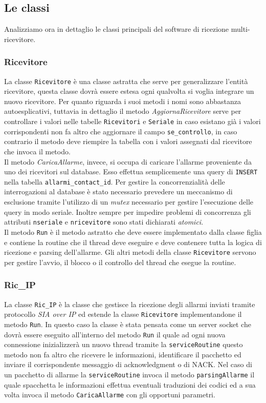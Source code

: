 \subsection{Le classi}
Analizziamo ora in dettaglio le classi principali del software di ricezione multi-ricevitore.
\subsubsection{Ricevitore}
La classe \texttt{Ricevitore} è una classe astratta che serve per generalizzare l'entità ricevitore, questa classe dovrà essere estesa ogni qualvolta si voglia integrare un nuovo ricevitore. Per quanto riguarda i suoi metodi i nomi sono abbastanza autoesplicativi, tuttavia in dettaglio il metodo \emph{AggiornaRicevitore} serve per controllare i valori nelle tabelle \texttt{Ricevitori} e \texttt{Seriale} in caso esistano già i valori corrispondenti non fa altro che aggiornare il campo \texttt{se\_controllo}, in caso contrario il metodo deve riempire la tabella con i valori assegnati dal ricevitore che invoca il metodo.\\
Il metodo \emph{CaricaAllarme}, invece, si occupa di caricare l'allarme proveniente da uno dei ricevitori sul database. Esso effettua semplicemente una query di \texttt{INSERT} nella tabella \texttt{allarmi\_contact\_id}. Per gestire la concorrenzialità delle interrogazioni al database è stato necessario prevedere un meccanismo di esclusione tramite l'utilizzo di un \emph{mutex} necessario per gestire l'esecuzione delle query in modo seriale. Inoltre sempre per impedire problemi di concorrenza gli attributi \texttt{nseriale} e \texttt{nricevitore} sono stati dichiarati \emph{atomici}.\\
Il metodo \texttt{Run} è il metodo astratto che deve essere implementato dalla classe figlia e contiene la routine che il thread deve eseguire e deve contenere tutta la logica di ricezione e parsing dell'allarme. Gli altri metodi della classe \texttt{Ricevitore} servono per gestire l'avvio, il blocco o il controllo del thread che esegue la routine.\\
\subsubsection{Ric\_IP}
La classe \texttt{Ric\_IP} è la classe che gestisce la ricezione degli allarmi inviati tramite protocollo \emph{SIA over IP} ed estende la classe \texttt{Ricevitore} implementandone il metodo \texttt{Run}. In questo caso la classe è stata pensata come un server socket che dovrà essere eseguito all'interno del metodo \texttt{Run} il quale ad ogni nuova connessione inizializzerà un nuovo  thread tramite la \texttt{serviceRoutine} questo metodo non fa altro che ricevere le informazioni, identificare il pacchetto ed inviare il corrispondente messaggio di acknowledgment o di NACK. Nel caso di un pacchetto di allarme la \texttt{serviceRoutine} invoca il metodo \texttt{parsingAllarme} il quale spacchetta le informazioni effettua eventuali traduzioni dei codici ed a sua volta invoca il metodo \texttt{CaricaAllarme} con gli opportuni parametri.

